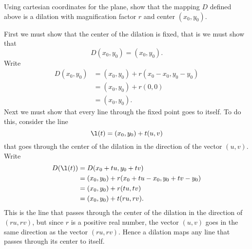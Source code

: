 \documentclass{ximera}
\begin{document}
\begin{question}
Using cartesian coordinates for the plane, show that the mapping $D$
defined above is a dilation with magnification factor $r$ and center
$\left( x_{0},y_{0}\right) $.
\begin{solution}
\begin{freeResponse}
First we must show that the center of the dilation is fixed, that is we must show that 
\[
D(x_0,y_0) = (x_0,y_0).
\]
Write
\begin{align*}
D(x_0,y_0) &= (x_0,y_0) + r(x_0-x_0,y_0-y_0)\\
&= (x_0,y_0) + r(0,0)\\
&=(x_0,y_0).
\end{align*}
Next we must show that every line through the fixed point goes to
itself. To do this, consider the line
\[
\l(t) = (x_0,y_0) + t(u,v)
\]
that goes through the center of the dilation in the direction of the
vector $(u,v)$. Write
\begin{align*}
D(\l(t)) &= D(x_0+tu,y_0+tv)\\
&= (x_0,y_0) + r(x_0+tu-x_0,y_0+tv-y_0)\\
&= (x_0,y_0) + r(tu,tv)\\
&= (x_0,y_0) + t(ru,rv). 
\end{align*}
This is the line that passes through the center of the dilation in the
direction of $(ru,rv)$, but since $r$ is a positive real number, the
vector $(u,v)$ goes in the same direction as the vector
$(ru,rv)$. Hence a dilation maps any line that passes through its
center to itself.


\end{freeResponse}
\end{solution}
\end{question}
\end{document}
